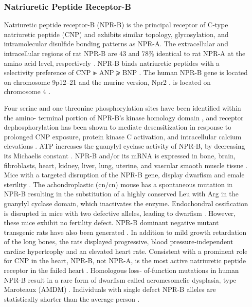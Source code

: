 \documentclass[14pt,a4paper,onecolumn]{article}
\begin{document}
\subsubsection{Natriuretic Peptide Receptor-B}
Natriuretic peptide receptor-B (NPR-B) is the principal receptor of C-type natriuretic peptide (CNP) and exhibits similar topology, glycosylation, and intramolecular disulfide bonding patterns as NPR-A. The extracellular and intracellular regions of rat NPR-B are 43 and 78\% identical to rat NPR-A at the amino acid level, respectively \citep{Schulz1989}. NPR-B binds natriuretic peptides with a selectivity preference of CNP ⪢ ANP ⩾ BNP \citep{Bennett1991} \citep{Koller1991} \citep{Suga1992a}. The human NPR-B gene is located on chromosome 9p12–21 and the murine version, Npr2 , is located on chromosome 4 \citep{Lowe1990}.

Four serine and one threonine phosphorylation sites have been identified within the amino- terminal portion of NPR-B's kinase homology domain \citep{Potter1998a}, and receptor dephosphorylation has been shown to mediate desensitization in response to prolonged CNP exposure, protein kinase C activation, and intracellular calcium elevations \citep{Potter1998} \citep{Potter2000} \citep{Potthast2004}. ATP increases the guanylyl cyclase activity of NPR-B, by decreasing its Michaelis constant \citep{Antos2007}.
NPR-B and/or its mRNA is expressed in bone, brain, fibroblasts, heart, kidney, liver, lung, uterine, and vascular smooth muscle tissue \citep{Bryan2006} \citep{Chrisman1993} \citep{Dickey2007} \citep{Herman1996} \citep{Langub1995}. Mice with a targeted disruption of the NPR-B gene, display dwarfism and  emale sterility \citep{Tamura2004}.
The achondroplastic (cn/cn) mouse has a spontaneous mutation in NPR-B resulting in the substitution of a highly conserved Leu with Arg in the guanylyl cyclase domain, which inactivates the enzyme. Endochondral ossification is disrupted in mice with two defective alleles, leading to dwarfism \citep{Tsuji2005}.
However, these mice exhibit no fertility defect. NPR-B dominant negative mutant transgenic rats have also been generated \citep{Langenickel2006}. In addition to mild growth retardation of the long bones, the rats displayed progressive, blood pressure-independent cardiac hypertrophy and an elevated heart rate. Consistent with a prominent role for CNP in the heart, NPR-B, not NPR-A, is the most active natriuretic peptide receptor in the failed heart \citep{Dickey2007}. Homologous loss- of-function mutations in human NPR-B result in a rare form of dwarfism called acromesomelic dysplasia, type Maroteaux (AMDM) \citep{Bartels2004}. Individuals with single defect NPR-B alleles are statistically shorter than the average person \citep{Olney 2006}.
\end{document}
